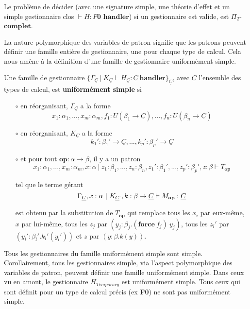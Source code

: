 \begin{theorem}
	Le problème de décider (avec une signature simple, une théorie d'effet et un simple gestionnaire clos $\vdash H:F\textbf{0~handler}$) si un gestionnaire est valide, est $\Pi_2$-$\textbf{complet}$.
\end{theorem}

La nature polymorphique des variables de patron signifie que les patrons peuvent définir une famille entière de gestionnaire, une pour chaque type de calcul. Cela nous amène à la définition d'une famille de gestionnaire uniformément simple.

\begin{definition}
	Une famille de gestionnaire $\{\Gamma_{\underline{C}}~|~K_{\underline{C}} \vdash H_{\underline{C}}:\underline{C}~\textbf{handler}\}_{\underline{C}}$, avec $\underline{C}$ l'ensemble des types de calcul, est \textbf{uniformément simple} si
	
	\begin{enumerate}
		\item[$\circ$] en réorganisant, $\Gamma_{\underline{C}}$ a la forme 
		\[x_1:\alpha_1,...,x_m:\alpha_m,f_1:U(\beta_1 \rightarrow \underline{C}),...,f_n:U(\beta_n \rightarrow \underline{C})\]
		
		\item[$\circ$] en réorganisant, $K_{\underline{C}}$ a la forme
		\[k_1':\beta_1' \rightarrow \underline{C},...,k_p':\beta_p' \rightarrow \underline{C}\]
		
		\item[$\circ$] et pour tout $\textbf{op}: \alpha \rightarrow \beta$, il y a un patron
		\[x_1:\alpha_1,...,x_m:\alpha_m,x:\alpha~|~z_1:\beta_1,...,z_n:\beta_n,z_1':\beta_1',...,z_p':\beta_p',z:\beta \vdash T_\textbf{op}\]
		
		tel que le terme gérant 
		\[\Gamma_{\underline{C}},x:\alpha~|~K_{\underline{C}`},k:\beta \rightarrow \underline{C} \vdash M_\textbf{op}:\underline{C}\]
		
		est obtenu par la substitution de $T_\textbf{op}$ qui remplace tous les $x_i$ par eux-même, $x$ par lui-même, tous les $z_j$ par $(y_j:\beta_j.(\textbf{force}~f_j)~y_j)$, tous les $z_l'$ par $(y_l':\beta_l'.k_l'(y_l'))$ et $z$ par $(y:\beta.k(y))$.
	\end{enumerate}
\end{definition}

Tous les gestionnaires du famille uniformément simple sont simple. Corollairement, tous les gestionnaires simple, via l'aspect polymorphique des variables de patron, peuvent définir une famille uniformément simple. Dans ceux vu en amont, le gestionnaire $H_{Temporary}$ est uniformément simple. Tous ceux qui sont définit pour un type de calcul précis (ex \textbf{F0}) ne sont pas uniformément simple.

